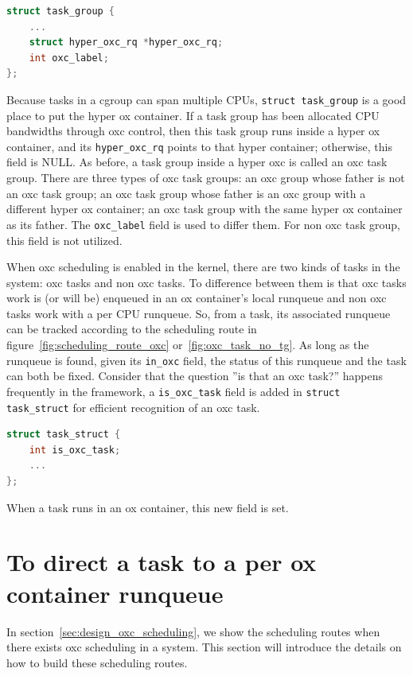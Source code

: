 \begin{lstlisting}[language=C, 
			caption={Extensions on 
					\texttt{struct task\_group}}]
struct task_group {
	...
	struct hyper_oxc_rq *hyper_oxc_rq;
	int oxc_label;
};
\end{lstlisting}
Because tasks in a cgroup can span multiple CPUs, \texttt{struct task\_group}
is a good place to put the hyper ox container. If a task group has been
allocated CPU bandwidths through oxc control, then this task group runs 
inside a hyper ox container, and its \texttt{hyper\_oxc\_rq} points 
to that hyper container; otherwise, this field is NULL. As before,
a task group inside a hyper oxc is called an oxc task group.
There are three types of oxc task groups: an oxc group whose father
is not an oxc task group; an oxc task group whose father is an oxc group
with a different hyper ox container; an oxc task group with the same hyper
ox container as its father. The \texttt{oxc\_label} field is used to 
differ them. For non oxc task group, this field is not utilized.

When oxc scheduling is enabled in the kernel, there are two kinds of tasks
in the system: oxc tasks and non oxc tasks. To difference between them
is that oxc tasks work is (or will be) enqueued in an ox container's local 
runqueue and non oxc tasks work with a per CPU runqueue. So, from a task, 
its associated runqueue can be tracked according to the scheduling route 
in figure~\ref{fig:scheduling_route_oxc} or~\ref{fig:oxc_task_no_tg}.
As long as the runqueue is found, given its \texttt{in\_oxc} field, the 
status of this runqueue and the task can both be fixed. Consider that 
the question ''is that an oxc task?'' happens frequently in the framework, 
a \texttt{is\_oxc\_task} field is added in \texttt{struct task\_struct} for 
efficient recognition of an oxc task.

\begin{lstlisting}[language=C, caption={\texttt{is\_oxc\_task} field in 
						\texttt{struct task\_struct}}]
struct task_struct {
	int is_oxc_task;
	...
};
\end{lstlisting}
When a task runs in an ox container, this new field is set.

\section{To direct a task to a per ox container runqueue\label{sec:redir}}

In section~\ref{sec:design_oxc_scheduling}, we show the scheduling routes
when there exists oxc scheduling in a system. This section will introduce
the details on how to build these scheduling routes.

